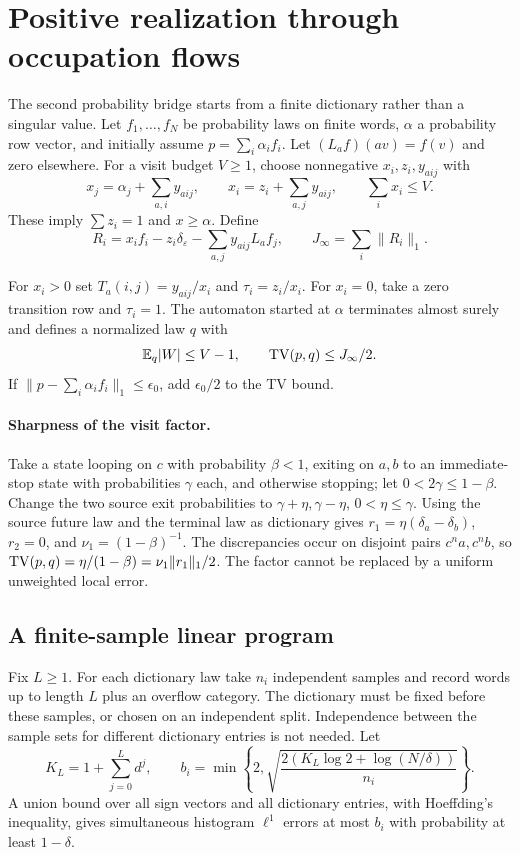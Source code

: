 \section{Positive realization through occupation flows}\label{II:U:sec:flows}
The second probability bridge starts from a finite dictionary rather than a
singular value. Let $f_1,\ldots,f_N$ be probability laws on finite words,
$\alpha$ a probability row vector, and initially assume
$p=\sum_i\alpha_i f_i$. Let $(L_af)(av)=f(v)$ and zero elsewhere.
For a visit budget $V\ge1$, choose nonnegative $x_i,z_i,y_{aij}$ with
\begin{equation}\label{II:U:eq:flow}
 x_j=\alpha_j+\sum_{a,i}y_{aij},\qquad
 x_i=z_i+\sum_{a,j}y_{aij},\qquad \sum_i x_i\le V.
\end{equation}
These imply $\sum z_i=1$ and $x\ge\alpha$. Define
\[
 R_i=x_if_i-z_i\delta_\varepsilon-\sum_{a,j}y_{aij}L_af_j,
 \qquad J_\infty=\sum_i\|R_i\|_1.
\]

\begin{theorem}\label{II:U:thm:flows}
For $x_i>0$ set $T_a(i,j)=y_{aij}/x_i$ and $\tau_i=z_i/x_i$.
For $x_i=0$, take a zero transition row and $\tau_i=1$.
The automaton started at $\alpha$ terminates almost surely and defines
a normalized law $q$ with
\[
 \mathbb E_q|W|\le V-1,\qquad \operatorname{TV}(p,q)\le J_\infty/2.
\]
If $\|p-\sum_i\alpha_if_i\|_1\le\epsilon_0$, add
$\epsilon_0/2$ to the TV bound.
\end{theorem}


\paragraph{Sharpness of the visit factor.}
Take a state looping on $c$ with probability $\beta<1$, exiting on $a,b$
to an immediate-stop state with probabilities $\gamma$ each, and otherwise
stopping; let $0<2\gamma\le1-\beta$. Change the two source exit
probabilities to $\gamma+\eta,\gamma-\eta$, $0<\eta\le\gamma$.
Using the source future law and the terminal law as dictionary gives
$r_1=\eta(\delta_a-\delta_b)$, $r_2=0$, and
$\nu_1=(1-\beta)^{-1}$. The discrepancies occur on disjoint pairs
$c^na,c^nb$, so
$\operatorname{TV}(p,q)=\eta/(1-\beta)=\nu_1\|r_1\|_1/2$.
The factor cannot be replaced by a uniform unweighted local error.

\subsection{A finite-sample linear program}\label{II:U:sec:flow-lp}
Fix $L\ge1$. For each dictionary law take $n_i$ independent samples and
record words up to length $L$ plus an overflow category. The dictionary
must be fixed before these samples, or chosen on an independent split.
Independence between the sample sets for different dictionary entries is
not needed. Let
\[
 K_L=1+\sum_{j=0}^Ld^j,\qquad
 b_i=\min\left\{2,\sqrt{\frac{2(K_L\log2+\log(N/\delta))}{n_i}}\right\}.
\]
A union bound over all sign vectors and all dictionary entries, with
Hoeffding's inequality, gives simultaneous histogram $\ell^1$ errors
at most $b_i$ with probability at least $1-\delta$.

